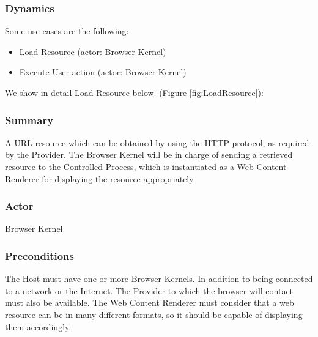 \documentclass[prodmode,acmtecs]{acmsmall}
\begin{document}
    \subsubsection*{Dynamics}
    Some use cases are the following:
    \begin{itemize}
      \item Load Resource (actor: Browser Kernel)

      \item Execute User action (actor: Browser Kernel)

    \end{itemize}
    We show in detail Load Resource below. (Figure \ref{fig:LoadResource}):
    \subsubsection*{Summary} A URL resource which can be obtained by using the HTTP protocol, as required by the Provider. The Browser Kernel will be in charge of sending a retrieved resource to the Controlled Process, which is instantiated as a Web Content Renderer for displaying the resource appropriately.
    \subsubsection*{Actor} Browser Kernel
    \subsubsection*{Preconditions} The Host must have one or more Browser Kernels. In addition to being connected to a network or the Internet. The Provider to which the browser will contact must also be available. The Web Content Renderer must consider that a web resource can be in many different formats, so it should be capable of displaying them accordingly.
\end{document}
